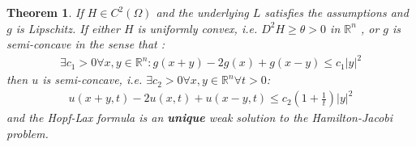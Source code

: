 \documentclass[a4paper,11pt,oneside,fleqn]{book}
\newtheorem{theorem}{Theorem}[section]
\theoremstyle{definition}
\theoremstyle{remark}
\begin{document}
\begin{theorem}
	If $H \in C^2(\Omega)$ and the underlying $L$ satisfies the assumptions and $g$ is Lipschitz. If either $H$ is uniformly convex, i.e. $D^2 H \geq \theta >0$ in $\mathbb{R}^n$ , or $g$ is semi-concave in the sense that :
		\begin{align*}
			\exists c_1 > 0 \forall x, y \in \mathbb{R}^n:
			g(x + y) - 2g(x) + g( x - y) \le c_1 |y|^2
		\end{align*}
		then $u$ is semi-concave, i.e.  $\exists c_2> 0 \forall x, y \in \mathbb{R}^n \forall t > 0$:
		\begin{align*}
			u(x+ y, t) - 2u(x, t) + u(x-y, t) \le c_2 (1 + \frac{1}{t} )|y|^2
		\end{align*}
		and the Hopf-Lax formula is an \textbf{unique} weak solution to the Hamilton-Jacobi problem. 
\end{theorem}
\end{document}
